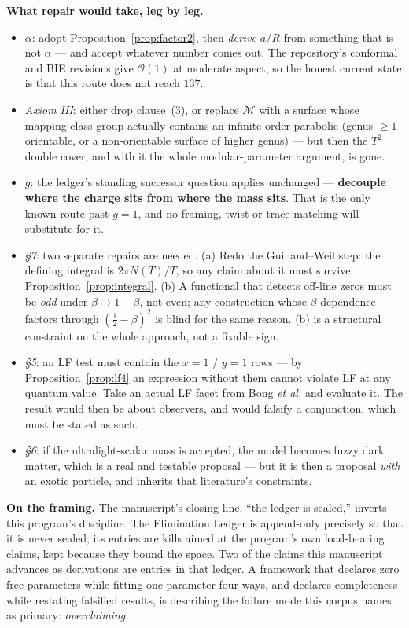 \documentclass[11pt,a4paper]{article}
\begin{document}
\textbf{What repair would take, leg by leg.}
\begin{itemize}[leftmargin=1.4em]
\item \emph{$\alpha$}: adopt Proposition~\ref{prop:factor2}, then \emph{derive}
  $a/R$ from something that is not $\alpha$ --- and accept whatever number comes
  out. The repository's conformal and BIE revisions give $\mathcal{O}(1)$ at
  moderate aspect, so the honest current state is that this route does not reach
  $137$.
\item \emph{Axiom III}: either drop clause~(3), or replace $\mathcal{M}$ with a
  surface whose mapping class group actually contains an infinite-order parabolic
  (genus $\geq1$ orientable, or a non-orientable surface of higher genus) --- but
  then the $T^2$ double cover, and with it the whole modular-parameter argument,
  is gone.
\item \emph{$g$}: the ledger's standing successor question applies unchanged ---
  \textbf{decouple where the charge sits from where the mass sits}. That is the only
  known route past $g=1$, and no framing, twist or trace matching will substitute
  for it.
\item \emph{\S7}: two separate repairs are needed. (a) Redo the Guinand--Weil step:
  the defining integral is $2\pi N(T)/T$, so any claim about it must survive
  Proposition~\ref{prop:integral}. (b) A functional that detects off-line zeros must
  be \emph{odd} under $\beta\mapsto1-\beta$, not even; any construction whose
  $\beta$-dependence factors through $(\tfrac12-\beta)^2$ is blind for the same
  reason. (b) is a structural constraint on the whole approach, not a fixable sign.
\item \emph{\S5}: an LF test must contain the $x=1$ / $y=1$ rows --- by
  Proposition~\ref{prop:lf4} an expression without them cannot violate LF at any
  quantum value. Take an actual LF facet from Bong \emph{et al.} and evaluate it.
  The result would then be about observers, and would falsify a conjunction, which
  must be stated as such.
\item \emph{\S6}: if the ultralight-scalar mass is accepted, the model becomes
  fuzzy dark matter, which is a real and testable proposal --- but it is then a
  proposal \emph{with} an exotic particle, and inherits that literature's
  constraints.
\end{itemize}

\textbf{On the framing.} The manuscript's closing line, ``the ledger is sealed,''
inverts this program's discipline. The Elimination Ledger is append-only precisely
so that it is never sealed; its entries are kills aimed at the program's own
load-bearing claims, kept because they bound the space. Two of the claims this
manuscript advances as derivations are entries in that ledger. A framework that
declares zero free parameters while fitting one parameter four ways, and declares
completeness while restating falsified results, is describing the failure mode this
corpus names as primary: \emph{overclaiming}.
\end{document}
